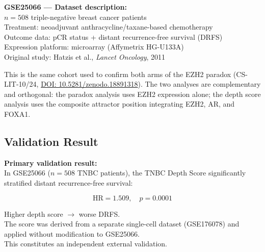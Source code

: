 \documentclass[12pt, a4paper]{article}
\begin{document}
\begin{center}
\colorbox{validationbox}{
\begin{minipage}{0.82\textwidth}
\vspace{0.4em}
\textbf{GSE25066 --- Dataset description:}\\[0.3em]
$n = 508$ triple-negative breast cancer patients\\
Treatment: neoadjuvant anthracycline/taxane-based
chemotherapy\\
Outcome data: pCR status + distant
recurrence-free survival (DRFS)\\
Expression platform: microarray
(Affymetrix HG-U133A)\\
Original study: Hatzis et al.,
\textit{Lancet Oncology}, 2011\\
\vspace{0.4em}
\end{minipage}}
\end{center}

\vspace{0.5em}

This is the same cohort used to confirm both arms
of the EZH2 paradox (CS-LIT-10/24,
\href{https://doi.org/10.5281/zenodo.18891318}
{DOI: 10.5281/zenodo.18891318}).
The two analyses are complementary and orthogonal:
the paradox analysis uses EZH2 expression alone;
the depth score analysis uses the composite
attractor position integrating EZH2, AR, and
FOXA1.

\subsection{Validation Result}

\begin{center}
\colorbox{findingbox}{
\begin{minipage}{0.88\textwidth}
\vspace{0.6em}
\textbf{Primary validation result:}\\[0.5em]
In GSE25066 ($n = 508$ TNBC patients),
the TNBC Depth Score significantly stratified
distant recurrence-free survival:

\[
\text{HR} = 1.509, \quad p = 0.0001
\]

Higher depth score $\rightarrow$ worse DRFS.\\[0.4em]
The score was derived from a separate single-cell
dataset (GSE176078) and applied without
modification to GSE25066.\\[0.3em]
This constitutes an independent external validation.
\vspace{0.5em}
\end{minipage}}
\end{center}
\end{document}
